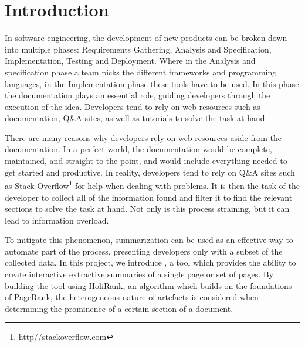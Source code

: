 \section{Introduction}\label{sec:introduction}
%


In software engineering, the development of new products can be broken down into multiple phases: Requirements Gathering, Analysis and Specification, Implementation, Testing and Deployment. Where in the Analysis and specification phase a team picks the different frameworks and programming languages, in the Implementation phase these tools have to be used. In this phase the documentation plays an essential role, guiding developers through the execution of the idea. Developers tend to rely on web resources such as documentation, Q\&A sites, as well as tutorials to solve the task at hand. 

There are many reasons why developers rely on web resources aside from the documentation. In a perfect world, the documentation would be complete, maintained, and straight to the point, and would include everything needed to get started and productive. In reality, developers tend to rely on Q\&A sites such as Stack Overflow\footnote{\url{http//stackoverflow.com}} for help when dealing with problems. It is then the task of the developer to collect all of the information found and filter it to find the relevant sections to solve the task at hand. Not only is this process straining, but it can lead to information overload.

To mitigate this phenomenon, summarization can be used as an effective way to automate part of the process, presenting developers only with a subset of the collected data. In this project, we introduce \projectName, a tool which provides the ability to create interactive extractive summaries of a single page or set of pages. By building the tool using HoliRank\cite{Ponz2017a}, an algorithm which builds on the foundations of PageRank\cite{ilprints422}, the heterogeneous nature of artefacts is considered when determining the prominence of a certain section of a document.


